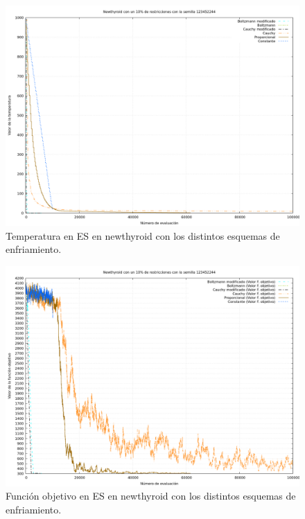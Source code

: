 \documentclass[12pt, spanish]{article}
\begin{document}
\begin{figure}[H]
	\centering
	\includegraphics[scale = 0.35]{cmp-tmp/newthyroid-temp.png}
	
	\caption{Temperatura en ES en newthyroid con los distintos esquemas de enfriamiento.}
	\label{fig:es-cmp2}
\end{figure}

\begin{figure}[H]
	\centering
	\includegraphics[scale = 0.35]{cmp-tmp/newthyroid-es.png}
	
	\caption{Función objetivo en ES en newthyroid con los distintos esquemas de enfriamiento.}
	\label{fig:es-cmp1}
\end{figure}
\end{document}
